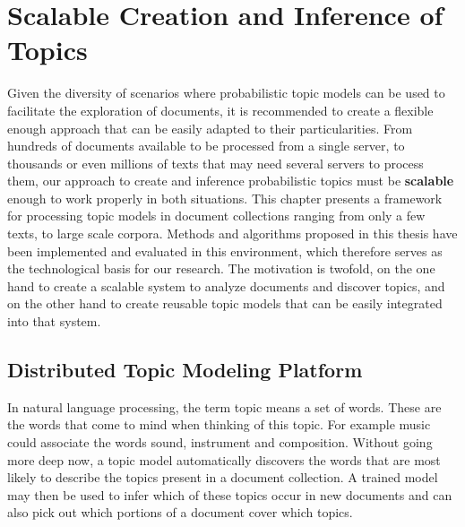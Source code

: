 

\chapter{Scalable Creation and Inference of Topics}\label{ch:scalability}

\graphicspath{{scalability/figures/}}


Given the diversity of scenarios where probabilistic topic models can be used to facilitate the exploration of documents, it is recommended to create a flexible enough approach that can be easily adapted to their particularities. From hundreds of documents available to be processed from a single server, to thousands or even millions of texts that may need several servers to process them, our approach to create and inference probabilistic topics must be \textbf{scalable} enough to work properly in both situations. This chapter presents a framework for processing topic models in document collections ranging from only a few texts, to large scale corpora. Methods and algorithms proposed in this thesis have been implemented and evaluated in this environment, which therefore serves as the technological basis for our research. The motivation is twofold, on the one hand to create a scalable system to analyze documents and discover topics, and on the other hand to create reusable topic models that can be easily integrated into that system.


\section{Distributed Topic Modeling Platform}




In natural language processing, the term topic means a set of words. These are the words that come to mind when thinking of this topic. For example music could associate the words sound, instrument and composition. Without going more deep now, a topic model automatically discovers the words that are most likely to describe the topics present in a document collection. A trained model may then be used to infer which of these topics occur in new documents and can also pick out which portions of a document cover which topics.

